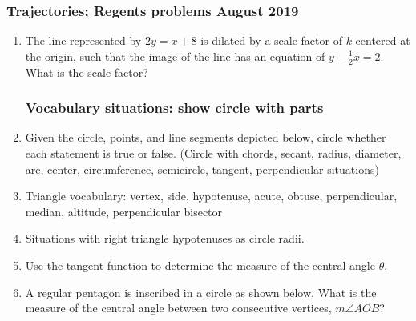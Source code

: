 \documentclass[12pt, twoside]{article}
\begin{document}
\subsubsection*{Trajectories; Regents problems August 2019}
  \begin{enumerate}

\subsubsection*{Sketch the situation on the axes. Mark important values. Do NOT solve!}
 
\item The line represented by $2y=x+8$ is dilated by a scale factor of $k$ centered at the origin, such that the image of the line has an equation of $\displaystyle y-\frac{1}{2}x=2$. What is the scale factor?
\begin{center}
\end{center}


\newpage   
\subsubsection*{Vocabulary situations: show circle with parts}
    
  \item Given the circle, points, and line segments depicted below, circle whether each statement is true or false.
  (Circle with chords, secant, radius, diameter, arc, center, circumference, semicircle, tangent, perpendicular situations)
  
  \item Triangle vocabulary: vertex, side, hypotenuse, acute, obtuse, perpendicular, median, altitude, perpendicular bisector
  
  \item Situations with right triangle hypotenuses as circle radii.

  \item Use the tangent function to determine the measure of the central angle $\theta$.
  
  \item A regular pentagon is inscribed in a circle as shown below. What is the measure of the central angle between two consecutive vertices, $m\angle AOB$?
  

\end{enumerate}
\end{document}
